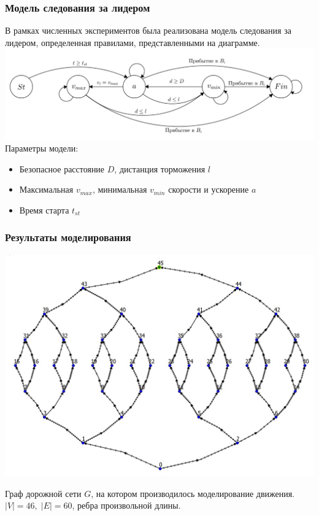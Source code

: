\documentclass{beamer}
\begin{document}
\begin{frame}\frametitle{Модель следования за лидером}
  В рамках численных экспериментов была реализована модель следования за лидером, определенная правилами, представленными на диаграмме.
  \includegraphics[width=\textwidth]{Micro-gen.png}
  Параметры модели: \\
  \begin{itemize}
  	\item Безопасное расстояние $D$, дистанция торможения $l$
  	\item Максимальная $v_{max}$, минимальная $v_{min}$ скорости и ускорение $a$
  	\item Время старта $t_{st}$
  \end{itemize}
\end{frame}


\begin{frame}\frametitle{Результаты моделирования}
	\begin{center}
		\includegraphics[scale=0.2]{Graph_N.jpg}
	\end{center}
   
   Граф дорожной сети $G$, на котором производилось моделирование движения. $|V| = 46, \; |E| = 60$, ребра произвольной длины.
\end{frame}
\end{document}
